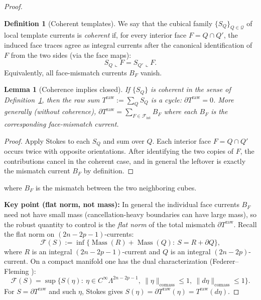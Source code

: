 \documentclass[11pt]{article}
\numberwithin{equation}{section}  %
\theoremstyle{plain}
\newtheorem{lemma}[theorem]{Lemma}
\theoremstyle{definition}
\newtheorem{definition}[theorem]{Definition}
\theoremstyle{remark}
\DeclareMathOperator{\Mass}{Mass}
\begin{document}
\begin{proof}
\begin{definition}[Coherent templates]\label{def:coherent-templates}
We say that the cubical family $\{S_Q\}_{Q\in\mathcal Q}$ of local template currents is \emph{coherent} if, for every interior face $F=Q\cap Q'$, the induced face traces agree as integral currents after the canonical identification of $F$ from the two sides (via the face maps): 
\[
S_Q\llcorner F = S_{Q'}\llcorner F.
\]
Equivalently, all face-mismatch currents $B_F$ vanish.
\end{definition}

\begin{lemma}[Coherence implies closed]\label{lem:coherence-implies-closed}
If $\{S_Q\}$ is coherent in the sense of Definition~\ref{def:coherent-templates}, then the raw sum $T^{\mathrm{raw}}:=\sum_Q S_Q$ is a cycle: $\partial T^{\mathrm{raw}}=0$. More generally (without coherence), $\partial T^{\mathrm{raw}}=\sum_{F\in\mathcal F_{\mathrm{int}}} B_F$ where each $B_F$ is the corresponding face-mismatch current.
\end{lemma}
\begin{proof}
Apply Stokes to each $S_Q$ and sum over $Q$. Each interior face $F=Q\cap Q'$ occurs twice with opposite orientations. After identifying the two copies of $F$, the contributions cancel in the coherent case, and in general the leftover is exactly the mismatch current $B_F$ by definition.
\end{proof}


where $B_F$ is the mismatch between the two neighboring cubes.

\textbf{Key point (flat norm, not mass):} In general the individual face currents $B_F$
need not have small mass (cancellation-heavy boundaries can have large mass), so the robust
quantity to control is the \emph{flat norm} of the total mismatch $\partial T^{\mathrm{raw}}$.
Recall the flat norm on $(2n-2p-1)$-currents:
\[
\mathcal F(S):=\inf\{\Mass(R)+\Mass(Q):\ S=R+\partial Q\},
\]
where $R$ is an integral $(2n-2p-1)$-current and $Q$ is an integral $(2n-2p)$-current.
On a compact manifold one has the dual characterization (Federer--Fleming
):
\[
\mathcal F(S)=\sup\{S(\eta):\ \eta\in C^\infty\Lambda^{2n-2p-1},\ \|\eta\|_{\mathrm{comass}}\le 1,\
\|d\eta\|_{\mathrm{comass}}\le 1\}.
\]
For $S=\partial T^{\mathrm{raw}}$ and such $\eta$, Stokes
 gives
$S(\eta)=\partial T^{\mathrm{raw}}(\eta)=T^{\mathrm{raw}}(d\eta)$.




\end{proof}
\end{document}
